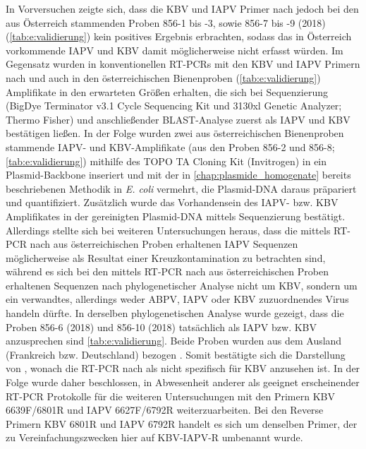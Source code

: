 In Vorversuchen zeigte sich, dass die KBV und IAPV Primer nach \cite{demiranda2010} jedoch bei den aus Österreich stammenden Proben 856-1 bis -3, sowie 856-7 bis -9 (2018) (\cref{tab:e:validierung}) kein positives Ergebnis erbrachten, sodass das in Österreich vorkommende IAPV und KBV damit möglicherweise nicht erfasst würden. Im Gegensatz wurden in konventionellen RT-PCRs mit den KBV und IAPV Primern nach \cite{stoltz1995} und \cite{maori2007} auch in den österreichischen Bienenproben (\cref{tab:e:validierung}) Amplifikate in den erwarteten Größen erhalten, die sich bei Sequenzierung (BigDye Terminator v3.1 Cycle Sequencing Kit und 3130xl Genetic Analyzer; Thermo Fisher) und anschließender BLAST-Analyse zuerst als IAPV und KBV bestätigen ließen. In der Folge wurden zwei aus österreichischen Bienenproben stammende IAPV- und KBV-Amplifikate (aus den Proben 856-2 und 856-8; \cref{tab:e:validierung}) mithilfe des TOPO TA Cloning\textsuperscript{\textregistered} Kit (Invitrogen) in ein Plasmid-Backbone inseriert und mit der in \cref{chap:plasmide_homogenate} bereits beschriebenen Methodik in \textit{E. coli} vermehrt, die Plasmid-DNA daraus präpariert und quantifiziert. Zusätzlich wurde das Vorhandensein des IAPV- bzw. KBV Amplifikates in der gereinigten Plasmid-DNA mittels Sequenzierung bestätigt. Allerdings stellte sich bei weiteren Untersuchungen heraus, dass die mittels RT-PCR nach \cite{maori2007} aus österreichischen Proben erhaltenen IAPV Sequenzen möglicherweise als Resultat einer Kreuzkontamination zu betrachten sind, während es sich bei den mittels RT-PCR nach \cite{stoltz1995} aus österreichischen Proben erhaltenen Sequenzen nach phylogenetischer Analyse nicht um KBV, sondern um ein verwandtes, allerdings weder ABPV, IAPV oder KBV zuzuordnendes Virus handeln dürfte. In derselben phylogenetischen Analyse wurde gezeigt, dass die Proben 856-6 (2018) und 856-10 (2018) tatsächlich als IAPV bzw. KBV anzusprechen sind \cref{tab:e:validierung}. Beide Proben wurden aus dem Ausland (Frankreich bzw. Deutschland) bezogen \citep{siede2005,blanchard2008}. Somit bestätigte sich die Darstellung von \cite{demiranda2010}, wonach die RT-PCR nach \cite{stoltz1995} als nicht spezifisch für KBV anzusehen ist. In der Folge wurde daher beschlossen, in Abwesenheit anderer als geeignet erscheinender RT-PCR Protokolle für die weiteren Untersuchungen mit den Primern KBV 6639F/6801R und IAPV 6627F/6792R \citep{demiranda2010} weiterzuarbeiten. Bei den Reverse Primern KBV 6801R und IAPV 6792R handelt es sich um denselben Primer, der zu Vereinfachungszwecken hier auf KBV-IAPV-R umbenannt wurde.


